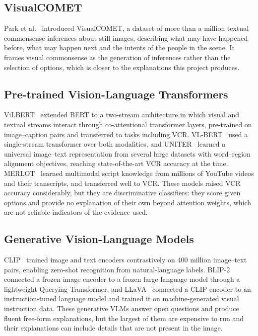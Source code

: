 \subsection{VisualCOMET}
Park et al.~\cite{park2020visualcomet} introduced VisualCOMET, a dataset of more than a million textual commonsense inferences about still images, describing what may have happened before, what may happen next and the intents of the people in the scene. It frames visual commonsense as the generation of inferences rather than the selection of options, which is closer to the explanations this project produces.

\subsection{Pre-trained Vision-Language Transformers}
ViLBERT~\cite{lu2019vilbert} extended BERT to a two-stream architecture in which visual and textual streams interact through co-attentional transformer layers, pre-trained on image--caption pairs and transferred to tasks including VCR. VL-BERT~\cite{su2020vlbert} used a single-stream transformer over both modalities, and UNITER~\cite{chen2020uniter} learned a universal image--text representation from several large datasets with word--region alignment objectives, reaching state-of-the-art VCR accuracy at the time. MERLOT~\cite{zellers2021merlot} learned multimodal script knowledge from millions of YouTube videos and their transcripts, and transferred well to VCR. These models raised VCR accuracy considerably, but they are discriminative classifiers: they score given options and provide no explanation of their own beyond attention weights, which are not reliable indicators of the evidence used.

\subsection{Generative Vision-Language Models}
CLIP~\cite{radford2021clip} trained image and text encoders contrastively on 400 million image--text pairs, enabling zero-shot recognition from natural-language labels. BLIP-2~\cite{li2023blip2} connected a frozen image encoder to a frozen large language model through a lightweight Querying Transformer, and LLaVA~\cite{liu2023llava} connected a CLIP encoder to an instruction-tuned language model and trained it on machine-generated visual instruction data. These generative VLMs answer open questions and produce fluent free-form explanations, but the largest of them are expensive to run and their explanations can include details that are not present in the image.

